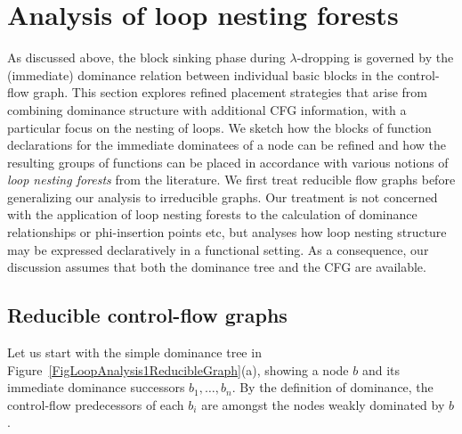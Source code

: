 \newcommand{\entrynode}[0]{\ensuremath{\mathbf{entry}}}
\newcommand{\exitnode}[0]{\ensuremath{\mathbf{exit}}}
\section{Analysis of loop nesting forests}
\label{sec:part1:semantics:LNF}
As discussed above, the block sinking phase during $\lambda$-dropping
is governed by the (immediate) dominance relation between individual
basic blocks in the control-flow graph. This section explores refined
placement strategies that arise from combining dominance structure
with additional CFG information, with a particular focus on the
nesting of loops. We sketch how the blocks of function declarations
for the immediate dominatees of a node can be refined and how the
resulting groups of functions can be placed in accordance with various
notions of \emph{loop nesting forests} from the literature. We first
treat reducible flow graphs before generalizing our analysis to
irreducible graphs.  Our treatment is not concerned with the
application of loop nesting forests to the calculation of dominance
relationships or phi-insertion points etc, but analyses how loop
nesting structure may be expressed declaratively in a functional
setting. As a consequence, our discussion assumes that both the
dominance tree and the CFG are available.

\subsection{Reducible control-flow graphs}
\label{sec:part1:semantics:LNF:reducible}
Let us start with the simple dominance tree in
Figure~\ref{FigLoopAnalysis1ReducibleGraph}(a), showing a node $b$ and
its immediate dominance successors $b_1, \ldots, b_n$.  By the
definition of dominance, the control-flow predecessors of each $b_i$
are amongst the nodes weakly dominated by $b$.

